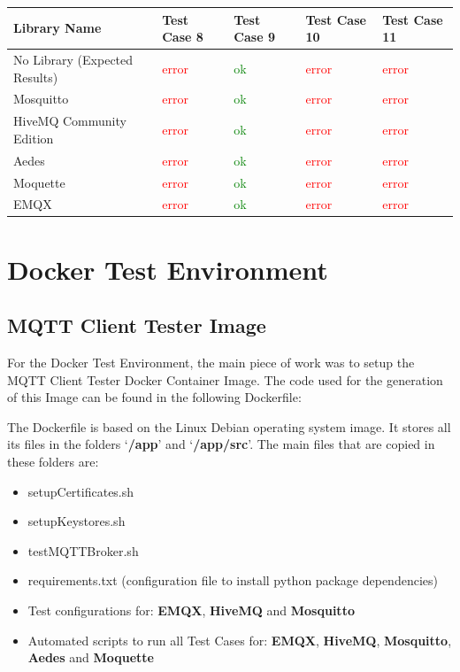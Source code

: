 \documentclass[binding=0.6cm,noexaminfo]{sapthesis}
\begin{document}
\begin{flushleft}
\begin{tabular}{| p{2cm} | p{1.5cm} | p{1.5cm} | p{1.5cm} | p{1.5cm} |}
\hline
\bf Library Name & \bf Test Case 8 & \bf Test Case 9 & \bf Test Case 10 & \bf Test Case 11 \\
\hline
No Library (Expected Results) & \textcolor{red}{error} & \textcolor{green}{ok} & \textcolor{red}{error} & \textcolor{red}{error} \\
\hline
Mosquitto & \textcolor{red}{error} & \textcolor{green}{ok} & \textcolor{red}{error} & \textcolor{red}{error} \\
\hline
HiveMQ Community Edition & \textcolor{red}{error} & \textcolor{green}{ok} & \textcolor{red}{error} & \textcolor{red}{error} \\
\hline
Aedes & \textcolor{red}{error} & \textcolor{green}{ok} & \textcolor{red}{error} & \textcolor{red}{error} \\
\hline
Moquette & \textcolor{red}{error} & \textcolor{green}{ok} & \textcolor{red}{error} & \textcolor{red}{error} \\
\hline
EMQX & \textcolor{red}{error} & \textcolor{green}{ok} & \textcolor{red}{error} & \textcolor{red}{error} \\
\hline
\end{tabular}
\end{flushleft}

\chapter{Docker Test Environment}
\section{MQTT Client Tester Image}
For the Docker Test Environment, the main piece of work was to setup the MQTT Client Tester Docker Container Image. The code used for the generation of this Image can be found in the following Dockerfile:


The Dockerfile is based on the Linux Debian operating system image. It stores all its files in the folders `\textbf{/app}' and `\textbf{/app/src}'. The main files that are copied in these folders are:
\begin{itemize}
	\item setupCertificates.sh
	\item setupKeystores.sh
	\item testMQTTBroker.sh
	\item requirements.txt (configuration file to install python package dependencies)
	\item Test configurations for: \textbf{EMQX}, \textbf{HiveMQ} and \textbf{Mosquitto}
	\item Automated scripts to run all Test Cases for: \textbf{EMQX}, \textbf{HiveMQ}, \textbf{Mosquitto}, \textbf{Aedes} and \textbf{Moquette}
\end{itemize}
\end{document}
